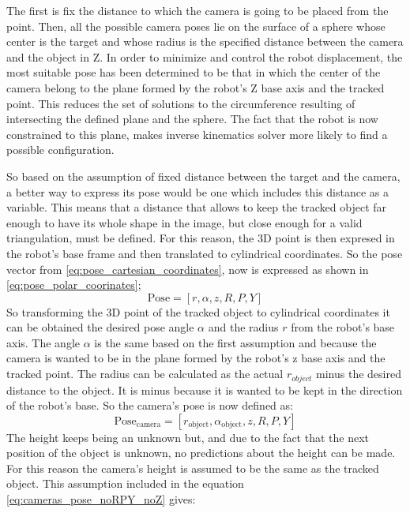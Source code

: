 	The first is fix the distance to which the camera is going to be placed from the point. Then, all the possible camera poses lie on the surface of a sphere whose center is the target and whose radius is the specified distance between the camera and the object in Z.
	In order to minimize and control the robot displacement, the most suitable pose has been determined to be that in which the center of the camera belong to the plane formed by the robot's Z base axis and the tracked point.
	This reduces the set of solutions to the circumference resulting of intersecting the defined plane and the sphere.
	The fact that the robot is now constrained to this plane, makes inverse kinematics solver more likely to find a possible configuration.

	So based on the assumption of fixed distance between the target and the camera, a better way to express its pose would be one which includes this distance as a variable.
	This means that a distance that allows to keep the tracked object far enough to have its whole shape in the image, but close enough for a valid triangulation, must be defined.
	For this reason, the 3D point is then expresed in the robot's base frame and then translated to cylindrical coordinates. So the pose vector from \ref{eq:pose_cartesian_coordinates}, now is expressed as shown in \ref{eq:pose_polar_coorinates};
		\begin{equation}
		\label{eq:pose_polar_coorinates}
			\mathrm{Pose} = [r,\alpha,z,R,P,Y]
		\end{equation}
	So transforming the 3D point of the tracked object to cylindrical coordinates it can be obtained the desired pose angle $\alpha$ and the radius $r$ from the robot's base axis.
	The angle $\alpha$ is the same based on the first assumption and because the camera is wanted to be in the plane formed by the robot's z base axis and the tracked point.
	The radius can be calculated as the actual $r_{object}$ minus the desired distance to the object. It is minus because it is wanted to be kept in the direction of the robot's base.
	So the camera's pose is now defined as:
		\begin{equation}
		\label{eq:cameras_pose_noRPY_noZ}
			\mathrm{Pose}_{\mathrm{camera}} = [r_{\mathrm{object}},\alpha_{\mathrm{object}},z,R,P,Y]
		\end{equation}
	The height keeps being an unknown but, and due to the fact that the next position of the object is unknown, no predictions about the height can be made.
	For this reason the camera's height is assumed to be the same as the tracked object. This assumption included in the equation \ref{eq:cameras_pose_noRPY_noZ} gives:
